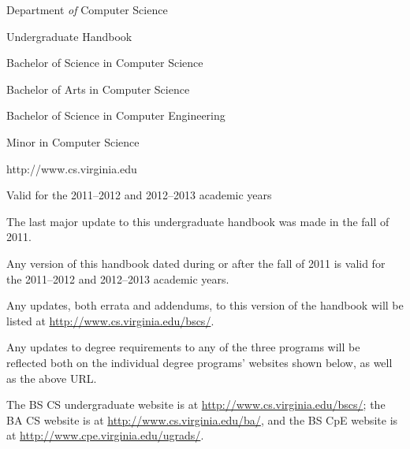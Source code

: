\documentclass[10pt,letter]{book}
\begin{document}
\pagestyle{empty}

\vspace*{0.5in}

\begin{figure}[h!]
\begin{center}
\end{center}
\end{figure}

\vspace{0.25in}

\begin{center}
{\huge Department {\em of} Computer Science}

{\huge Undergraduate Handbook}

\vspace{1in}

{\Large Bachelor of Science in Computer Science}

{\Large Bachelor of Arts in Computer Science}

{\Large Bachelor of Science in Computer Engineering}

{\Large Minor in Computer Science}

\vspace{1in}

{\large http://www.cs.virginia.edu}

{\large Valid for the 2011--2012 and 2012--2013 academic years}
\end{center}


\clearpage

\vspace*{1.5in}

\begin{center}
\parbox{3in} {The last major update to this undergraduate handbook was
  made in the fall of 2011.
\newline

Any version of this handbook dated during or after the fall
of 2011 is valid for the 2011--2012 and 2012--2013 academic years.
\newline

Any updates, both errata and addendums, to this version of the
handbook will be listed at \url{http://www.cs.virginia.edu/bscs/}.
\newline

Any updates to degree requirements to any of the three programs will
be reflected both on the individual degree programs' websites shown
below, as well as the above URL.
\newline

The BS CS undergraduate website is at
\url{http://www.cs.virginia.edu/bscs/}; the BA CS website is at
\url{http://www.cs.virginia.edu/ba/}, and the BS CpE website is at
\url{http://www.cpe.virginia.edu/ugrads/}.
\newline

}
\end{center}
\end{document}
